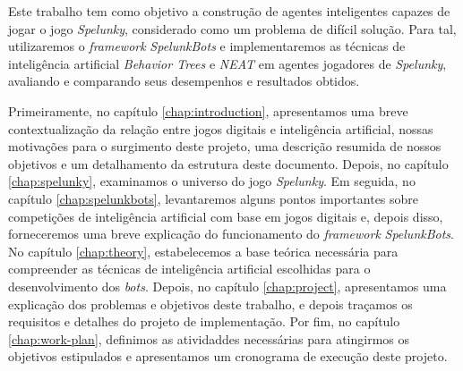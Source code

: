 Este trabalho tem como objetivo a construção de agentes inteligentes capazes de
jogar o jogo \textit{Spelunky}, considerado como um problema de difícil solução.
Para tal, utilizaremos o \textit{framework} \textit{SpelunkBots} e
implementaremos as técnicas de inteligência artificial \textit{Behavior Trees} e
\textit{NEAT} em agentes jogadores de \textit{Spelunky}, avaliando e comparando
seus desempenhos e resultados obtidos.

Primeiramente, no capítulo \ref{chap:introduction}, apresentamos uma breve
contextualização da relação entre jogos digitais e inteligência artificial,
nossas motivações para o surgimento deste projeto, uma descrição resumida de
nossos objetivos e um detalhamento da estrutura deste documento. Depois, no
capítulo \ref{chap:spelunky}, examinamos o universo do jogo \textit{Spelunky}.
Em seguida, no capítulo \ref{chap:spelunkbots}, levantaremos alguns pontos
importantes sobre competições de inteligência artificial com base em jogos
digitais e, depois disso, forneceremos uma breve explicação do funcionamento do
\textit{framework} \textit{SpelunkBots}. No capítulo \ref{chap:theory},
estabelecemos a base teórica necessária para compreender as técnicas de
inteligência artificial escolhidas para o desenvolvimento dos \textit{bots}.
Depois, no capítulo \ref{chap:project}, apresentamos uma explicação dos
problemas e objetivos deste trabalho, e depois traçamos os requisitos e detalhes
do projeto de implementação. Por fim, no capítulo \ref{chap:work-plan},
definimos as atividaddes necessárias para atingirmos os objetivos estipulados e
apresentamos um cronograma de execução deste projeto.
